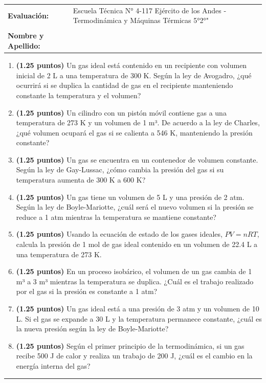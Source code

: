 \documentclass[../examen.tex]{subfiles}
\begin{document}
\noindent
\begin{tabular}{ll}
\textbf{Evaluación:} & Escuela Técnica N° 4-117 Ejército de los Andes - Termodinámica y Máquinas Térmicas 5°2°" \\
 & \\

\textbf{Nombre y Apellido:} & \hrulefill \\
\end{tabular}

\begin{enumerate}
    \item \textbf{(1.25 puntos)} Un gas ideal está contenido en un recipiente con volumen inicial de 2 L a una temperatura de 300 K. Según la ley de Avogadro, ¿qué ocurrirá si se duplica la cantidad de gas en el recipiente manteniendo constante la temperatura y el volumen?

    \item \textbf{(1.25 puntos)} Un cilindro con un pistón móvil contiene gas a una temperatura de 273 K y un volumen de 1 m³. De acuerdo a la ley de Charles, ¿qué volumen ocupará el gas si se calienta a 546 K, manteniendo la presión constante?

    \item \textbf{(1.25 puntos)} Un gas se encuentra en un contenedor de volumen constante. Según la ley de Gay-Lussac, ¿cómo cambia la presión del gas si su temperatura aumenta de 300 K a 600 K?

    \item \textbf{(1.25 puntos)} Un gas tiene un volumen de 5 L y una presión de 2 atm. Según la ley de Boyle-Mariotte, ¿cuál será el nuevo volumen si la presión se reduce a 1 atm mientras la temperatura se mantiene constante?

    \item \textbf{(1.25 puntos)} Usando la ecuación de estado de los gases ideales, \( PV = nRT \), calcula la presión de 1 mol de gas ideal contenido en un volumen de 22.4 L a una temperatura de 273 K.

    \item \textbf{(1.25 puntos)} En un proceso isobárico, el volumen de un gas cambia de 1 m³ a 3 m³ mientras la temperatura se duplica. ¿Cuál es el trabajo realizado por el gas si la presión es constante a 1 atm?

    \item \textbf{(1.25 puntos)} Un gas ideal está a una presión de 3 atm y un volumen de 10 L. Si el gas se expande a 30 L y la temperatura permanece constante, ¿cuál es la nueva presión según la ley de Boyle-Mariotte?

    \item \textbf{(1.25 puntos)} Según el primer principio de la termodinámica, si un gas recibe 500 J de calor y realiza un trabajo de 200 J, ¿cuál es el cambio en la energía interna del gas?
\end{enumerate}

\vspace{0.6cm}
\rule{.9\textwidth}{.1mm}
\vspace{0.6cm}
\end{document}
